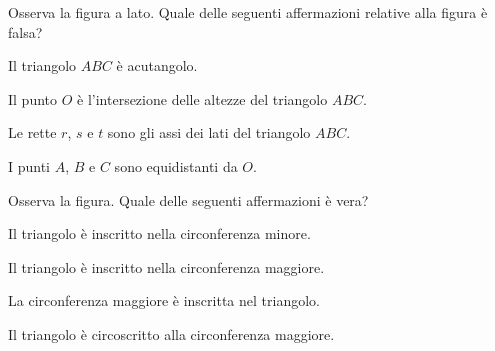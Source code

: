 \noindent\begin{minipage}{0.7\textwidth}\parindent15pt
\begin{esercizio}
\label{ese:5.59}
Osserva la figura a lato. Quale delle seguenti affermazioni relative 
alla figura è falsa?
\begin{enumeratea}
\item Il triangolo \(ABC\) è acutangolo.
\item Il punto \(O\) è l'intersezione delle altezze del triangolo \(ABC\).
\item Le rette \(r\), \(s\) e \(t\) sono gli assi dei lati del triangolo 
\(ABC\).
\item I punti \(A\), \(B\) e \(C\) sono equidistanti da \(O\).
\end{enumeratea}
\end{esercizio}
\end{minipage}\hfil
\begin{minipage}{0.3\textwidth}
	\centering
\end{minipage}\vspace{5pt}

\noindent\begin{minipage}{0.7\textwidth}\parindent15pt
\begin{esercizio}
\label{ese:5.60}
Osserva la figura. Quale delle seguenti affermazioni è vera?
\begin{enumeratea}
\item Il triangolo è inscritto nella circonferenza minore.
\item Il triangolo è inscritto nella circonferenza maggiore.
\item La circonferenza maggiore è inscritta nel triangolo.
\item Il triangolo è circoscritto alla circonferenza maggiore.
\end{enumeratea}
\end{esercizio}
\end{minipage}\hfil
\begin{minipage}{0.3\textwidth}
	\centering
\end{minipage}\vspace{5pt}

